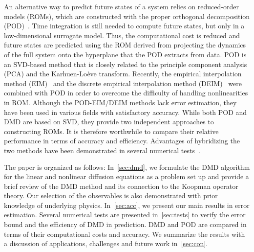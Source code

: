 \documentclass[10pt]{article}
\numberwithin{equation}{section}
\theoremstyle{plain}
\theoremstyle{remark}
\theoremstyle{remark}
\begin{document}
An alternative way to predict future states of a system relies on reduced-order models (ROMs), which are constructed with the proper orthogonal decomposition (POD)~\cite{kerschen2005method, rowley2005model}. Time integration is still needed to compute future states, but only in a low-dimensional surrogate model. Thus, the computational cost is reduced and future states are predicted using the ROM derived from projecting the dynamics of the full system onto the hyperplane that the POD extracts from data. POD is an SVD-based method that is closely related to the principle component analysis (PCA) and the Karhuen-Lo\`eve transform. Recently, the empirical interpolation method (EIM)~\cite{barrault2004empirical} and the discrete empirical interpolation method (DEIM)~\cite{chaturantabut2010nonlinear} were combined with POD in order to overcome the difficulty of handling nonlinearities in ROM. Although the POD-EIM/DEIM methods lack error estimation, they have been used in various fields with satisfactory accuracy. While both POD and DMD are based on SVD, they provide two independent approaches to constructing ROMs. It is therefore worthwhile to compare their relative performance in terms of accuracy and efficiency. Advantages of hybridizing the two methods have been demonstrated in several numerical tests~\cite{alla2017nonlinear,williams2013hybrid}.

The paper is organized as follows: In~\cref{sec:dmd}, we formulate the DMD algorithm for the linear and nonlinear diffusion equations as a problem set up and provide a brief review of the DMD method and its connection to the Koopman operator theory. Our selection of the observables is also demonstrated with prior knowledge of underlying physics. In~\cref{sec:acc}, we present our main results in error estimation. Several numerical tests are presented in~\cref{sec:tests} to verify the error bound and the efficiency of DMD in prediction.  DMD and POD are compared in terms of their computational costs and accuracy. We summarize the results with a discussion of applications, challenges and future work in~\cref{sec:con}.
\end{document}
